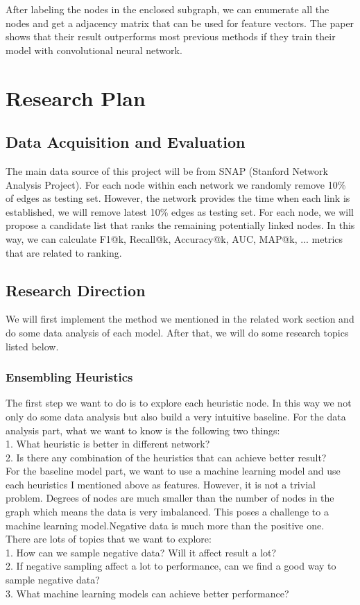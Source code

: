 \documentclass[paper=letter, fontsize=12pt]{scrartcl} %
\begin{document}
After labeling the nodes in the enclosed subgraph, we can enumerate all the nodes and get a adjacency matrix that can be used for feature vectors. The paper shows that their result outperforms most previous methods if they train their model with convolutional neural network.


\section{Research Plan}

\subsection{Data Acquisition and Evaluation}
The main data source of this project will be from SNAP (Stanford Network Analysis Project).
For each node within each network we randomly remove 10\% of edges as testing set. However, the network provides the time when each link is established, we will remove latest 10\% edges as testing set. For each node, we will propose a candidate list that ranks the remaining potentially linked nodes. In this way, we can calculate F1@k, Recall@k, Accuracy@k, AUC, MAP@k, ... metrics that are related to ranking. 

\subsection {Research Direction}
We will first implement the method we mentioned in the related work section and do some data analysis of each model. After that, we will do some research topics listed below. 

\subsubsection {Ensembling Heuristics}
The first step we want to do is to explore each heuristic node. In this way we not only do some data analysis but also build a very intuitive baseline. 
For the data analysis part, what we want to know is the following two things: \\
1. What heuristic is better in different network? \\
2. Is there any combination of the heuristics that can achieve better result? \\

For the baseline model part, we want to use a machine learning model and use each heuristics I mentioned above as features. However, it is not a trivial problem. Degrees of nodes are much smaller than the number of nodes in the graph which means the data is very imbalanced. This poses a challenge to a machine learning model.Negative data is much more than the positive one.\\
There are lots of topics that we want to explore: \\
1. How can we sample negative data? Will it affect result a lot? \\
2. If negative sampling affect a lot to performance, can we find a good way to sample negative data? \\
3. What machine learning models can achieve better performance? \\
\end{document}
